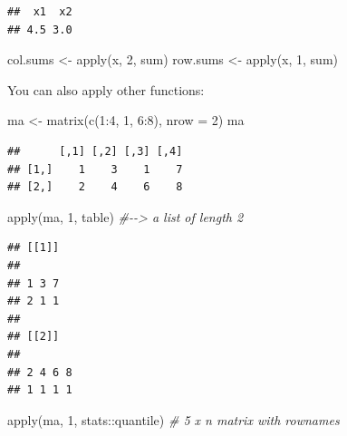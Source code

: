 \documentclass[
  12pt,
]{krantz}
\makeatletter
\newenvironment{Shaded}{\begin{snugshade}}{\end{snugshade}}
\newcommand{\AttributeTok}[1]{\textcolor[rgb]{0.61,0.61,0.61}{#1}}
\newcommand{\CommentTok}[1]{\textcolor[rgb]{0.37,0.37,0.37}{\textit{#1}}}
\newcommand{\DecValTok}[1]{\textcolor[rgb]{0.06,0.06,0.06}{#1}}
\newcommand{\FunctionTok}[1]{\textcolor[rgb]{0,0,0}{#1}}
\newcommand{\NormalTok}[1]{#1}
\newcommand{\OtherTok}[1]{\textcolor[rgb]{0.37,0.37,0.37}{#1}}
\newcommand{\SpecialCharTok}[1]{\textcolor[rgb]{0,0,0}{#1}}
\newenvironment{kframe}{%
\medskip{}
\setlength{\fboxsep}{.8em}
 \def\at@end@of@kframe{}%
 \ifinner\ifhmode%
  \def\at@end@of@kframe{\end{minipage}}%
  \begin{minipage}{\columnwidth}%
 \fi\fi%
 \def\FrameCommand##1{\hskip\@totalleftmargin \hskip-\fboxsep
 \colorbox{shadecolor}{##1}\hskip-\fboxsep
     \hskip-\linewidth \hskip-\@totalleftmargin \hskip\columnwidth}%
 \MakeFramed {\advance\hsize-\width
   \@totalleftmargin\z@ \linewidth\hsize
   \@setminipage}}%
 {\par\unskip\endMakeFramed%
 \at@end@of@kframe}
\renewenvironment{Shaded}{\begin{kframe}}{\end{kframe}}
\makeatother
\begin{document}
\begin{verbatim}
##  x1  x2 
## 4.5 3.0
\end{verbatim}

\begin{Shaded}
\begin{Highlighting}[]
\NormalTok{col.sums }\OtherTok{\textless{}{-}} \FunctionTok{apply}\NormalTok{(x, }\DecValTok{2}\NormalTok{, sum)}
\NormalTok{row.sums }\OtherTok{\textless{}{-}} \FunctionTok{apply}\NormalTok{(x, }\DecValTok{1}\NormalTok{, sum)}
\end{Highlighting}
\end{Shaded}

You can also apply other functions:

\begin{Shaded}
\begin{Highlighting}[]
\NormalTok{ma }\OtherTok{\textless{}{-}} \FunctionTok{matrix}\NormalTok{(}\FunctionTok{c}\NormalTok{(}\DecValTok{1}\SpecialCharTok{:}\DecValTok{4}\NormalTok{, }\DecValTok{1}\NormalTok{, }\DecValTok{6}\SpecialCharTok{:}\DecValTok{8}\NormalTok{), }\AttributeTok{nrow =} \DecValTok{2}\NormalTok{)}
\NormalTok{ma}
\end{Highlighting}
\end{Shaded}

\begin{verbatim}
##      [,1] [,2] [,3] [,4]
## [1,]    1    3    1    7
## [2,]    2    4    6    8
\end{verbatim}

\begin{Shaded}
\begin{Highlighting}[]
\FunctionTok{apply}\NormalTok{(ma, }\DecValTok{1}\NormalTok{, table)  }\CommentTok{\#{-}{-}\textgreater{} a list of length 2}
\end{Highlighting}
\end{Shaded}

\begin{verbatim}
## [[1]]
## 
## 1 3 7 
## 2 1 1 
## 
## [[2]]
## 
## 2 4 6 8 
## 1 1 1 1
\end{verbatim}

\begin{Shaded}
\begin{Highlighting}[]
\FunctionTok{apply}\NormalTok{(ma, }\DecValTok{1}\NormalTok{, stats}\SpecialCharTok{::}\NormalTok{quantile) }\CommentTok{\# 5 x n matrix with rownames}
\end{Highlighting}
\end{Shaded}
\end{document}
